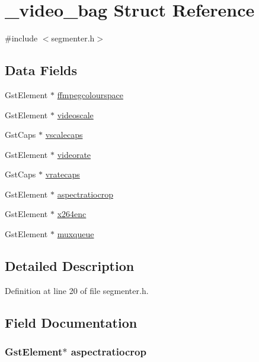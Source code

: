 \hypertarget{struct__video__bag}{\section{\-\_\-video\-\_\-bag \-Struct \-Reference}
\label{struct__video__bag}
}


{\ttfamily \#include $<$segmenter.\-h$>$}

\subsection*{\-Data \-Fields}
\begin{DoxyCompactItemize}
\item 
\-Gst\-Element $\ast$ \hyperlink{struct__video__bag_ae45b3f4ec98e5e429bf58f9ded85c0b4}{ffmpegcolourspace}
\item 
\-Gst\-Element $\ast$ \hyperlink{struct__video__bag_a87efc6ab0a3185089398de023439e26b}{videoscale}
\item 
\-Gst\-Caps $\ast$ \hyperlink{struct__video__bag_aa5f3820b0694a8f5358db66149ec7f10}{vscalecaps}
\item 
\-Gst\-Element $\ast$ \hyperlink{struct__video__bag_a14ada90c504b234ba99ef9a409d6a52f}{videorate}
\item 
\-Gst\-Caps $\ast$ \hyperlink{struct__video__bag_aa7a0309620904096b3d69456f926e19d}{vratecaps}
\item 
\-Gst\-Element $\ast$ \hyperlink{struct__video__bag_a6326c44e2f268ecff91f4198f0e0c60b}{aspectratiocrop}
\item 
\-Gst\-Element $\ast$ \hyperlink{struct__video__bag_a84465e4de5a0a5270d0b3d0f03e93f03}{x264enc}
\item 
\-Gst\-Element $\ast$ \hyperlink{struct__video__bag_a917a2aa09433aafbcda72454d53c196f}{muxqueue}
\end{DoxyCompactItemize}


\subsection{\-Detailed \-Description}


\-Definition at line 20 of file segmenter.\-h.



\subsection{\-Field \-Documentation}
\hypertarget{struct__video__bag_a6326c44e2f268ecff91f4198f0e0c60b}{
\subsubsection[{aspectratiocrop}]{\setlength{\rightskip}{0pt plus 5cm}\-Gst\-Element$\ast$ {\bf aspectratiocrop}}}\label{struct__video__bag_a6326c44e2f268ecff91f4198f0e0c60b}


